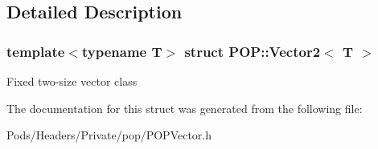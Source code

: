 \subsection{Detailed Description}
\subsubsection*{template$<$typename T$>$\newline
struct P\+O\+P\+::\+Vector2$<$ T $>$}

Fixed two-\/size vector class 

The documentation for this struct was generated from the following file\+:\begin{DoxyCompactItemize}
\item 
Pods/\+Headers/\+Private/pop/P\+O\+P\+Vector.\+h\end{DoxyCompactItemize}
